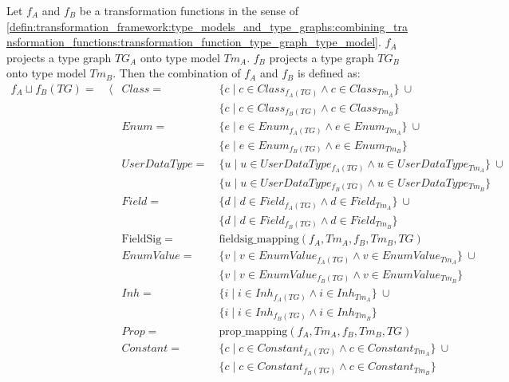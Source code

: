 \begin{defin}
\label{defin:transformation_framework:type_models_and_type_graphs:combining_transformation_functions:combination_transformation_function_type_graph_type_model}
Let $f_A$ and $f_B$ be a transformation functions in the sense of \cref{defin:transformation_framework:type_models_and_type_graphs:combining_transformation_functions:transformation_function_type_graph_type_model}. $f_A$ projects a type graph $TG_A$ onto type model $Tm_A$. $f_B$ projects a type graph $TG_B$ onto type model $Tm_B$. Then the combination of $f_A$ and $f_B$ is defined as:
\begin{align*}
f_{A} \sqcup f_{B}(TG) =\ &\langle&
Class =\ &\{c \mid c \in Class_{f_{A}(TG)} \land c \in Class_{Tm_A} \}\ \cup\\&&&
\{c \mid c \in Class_{f_{B}(TG)} \land c \in Class_{Tm_B} \} \\&&
Enum =\ &\{e \mid e \in Enum_{f_{A}(TG)} \land e \in Enum_{Tm_A} \}\ \cup\\&&&
\{e \mid e \in Enum_{f_{B}(TG)} \land e \in Enum_{Tm_B} \} \\&&
UserDataType =\ &\{u \mid u \in UserDataType_{f_{A}(TG)} \land u \in UserDataType_{Tm_A} \}\ \cup\\&&&
\{u \mid u \in UserDataType_{f_{B}(TG)} \land u \in UserDataType_{Tm_B} \} \\&&
Field =\ &\{d \mid d \in Field_{f_{A}(TG)} \land d \in Field_{Tm_A} \}\ \cup\\&&&
\{d \mid d \in Field_{f_{B}(TG)} \land d \in Field_{Tm_B} \} \\&&
\mathrm{FieldSig} =\ &\mathrm{fieldsig\_\!mapping}(f_A, Tm_A, f_B, Tm_B, TG) \\&&
EnumValue =\ &\{v \mid v \in EnumValue_{f_{A}(TG)} \land v \in EnumValue_{Tm_A} \}\ \cup\\&&&
\{v \mid v \in EnumValue_{f_{B}(TG)} \land v \in EnumValue_{Tm_B} \} \\&&
Inh =\ &\{i \mid i \in Inh_{f_{A}(TG)} \land i \in Inh_{Tm_A} \}\ \cup\\&&&
\{i \mid i \in Inh_{f_{B}(TG)} \land i \in Inh_{Tm_B} \} \\&&
Prop =\ &\mathrm{prop\_\!mapping}(f_A, Tm_A, f_B, Tm_B, TG) \\&&
Constant =\ &\{c \mid c \in Constant_{f_{A}(TG)} \land c \in Constant_{Tm_A} \}\ \cup\\&&&
\{c \mid c \in Constant_{f_{B}(TG)} \land c \in Constant_{Tm_B} \} \\&&

\end{align*}
\end{defin}
